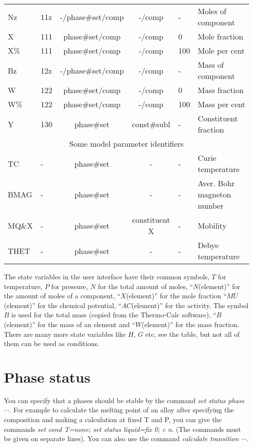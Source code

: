 \documentclass[12pt]{article}
\begin{document}
\begin{table}[!h]
\begin{tabular}{|llccll|}
Nz     & 11z & -/phase\#set/comp & -/comp & -  & Moles of component\\
X      & 111 & phase\#set/comp & -/comp & 0  & Mole fraction\\
X\%    & 111 & phase\#set/comp & -/comp & 100 & Mole per cent\\
Bz     & 12z & -/phase\#set/comp & -/comp & -  & Mass of component\\
W      & 122 & phase\#set/comp & -/comp & 0 & Mass fraction\\
W\%    & 122 & phase\#set/comp & -/comp & 100 & Mass per cent\\
Y      & 130 & phase\#set & const\#subl & -& Constituent fraction\\\hline
\multicolumn{6}{|c|}{Some model parameter identifiers}\\\hline
TC     & - & phase\#set & - & - & Curie temperature\\
BMAG   & - & phase\#set & - & - & Aver. Bohr magneton number\\
MQ\&X  & - & phase\#set & constituent X & - & Mobility\\
THET   & - & phase\#set & - & - & Debye temperature\\\hline
\end{tabular}
\end{table}

The state variables in the user interface have their common symbols,
$T$ for temperature, $P$ for pressure, $N$ for the total amount of
moles, ``$N$(element)'' for the amount of moles of a component,
``$X$(element)'' for the mole fraction ``$MU$(element)'' for the
chemical potential, ``$AC$(element)'' for the activity.  The symbol
$B$ is used for the total mass (copied from the Thermo-Calc software),
``$B$(element)'' for the mass of an element and ``$W$(element)'' for
the mass fraction.  There are many more state variables like $H$, $G$
etc, see the table, but not all of them can be used as conditions.

\section{Phase status}

You can specify that a phases should be stable by the command {\em set
  status phase $\cdots$}.  For example to calculate the melting point
of an alloy after specifying the composition and making a calculation
at fixed T and P, you can give the commands {\em set cond T=none; set
  status liquid=fix 0; c n}.  (The commands must be given on separate
lines).  You can also use the command {\em calculate transition
  $\cdots$}.
\end{document}
